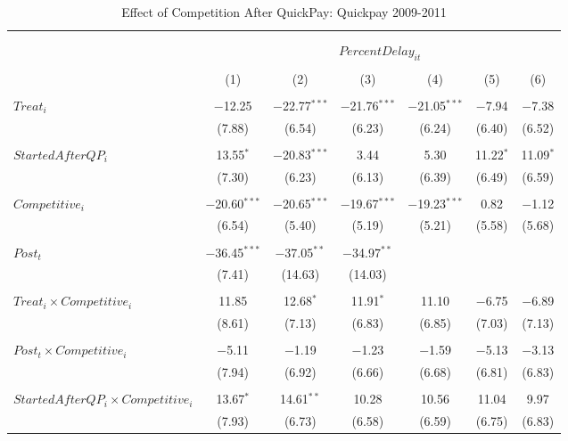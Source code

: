 \documentclass[
]{article}
\begin{document}
\begin{table}[H] \centering 
  \caption{Effect of Competition After QuickPay: Quickpay 2009-2011} 
  \label{} 
\small 
\begin{tabular}{@{\extracolsep{-3pt}}lcccccc} 
\\[-1.8ex]\hline 
\hline \\[-1.8ex] 
\\[-1.8ex] & \multicolumn{6}{c}{$PercentDelay_{it}$  } \\ 
\\[-1.8ex] & (1) & (2) & (3) & (4) & (5) & (6)\\ 
\hline \\[-1.8ex] 
 $Treat_i$ & $-$12.25 & $-$22.77$^{***}$ & $-$21.76$^{***}$ & $-$21.05$^{***}$ & $-$7.94 & $-$7.38 \\ 
  & (7.88) & (6.54) & (6.23) & (6.24) & (6.40) & (6.52) \\ 
  & & & & & & \\ 
 $StartedAfterQP_i$ & 13.55$^{*}$ & $-$20.83$^{***}$ & 3.44 & 5.30 & 11.22$^{*}$ & 11.09$^{*}$ \\ 
  & (7.30) & (6.23) & (6.13) & (6.39) & (6.49) & (6.59) \\ 
  & & & & & & \\ 
 $Competitive_i$ & $-$20.60$^{***}$ & $-$20.65$^{***}$ & $-$19.67$^{***}$ & $-$19.23$^{***}$ & 0.82 & $-$1.12 \\ 
  & (6.54) & (5.40) & (5.19) & (5.21) & (5.58) & (5.68) \\ 
  & & & & & & \\ 
 $Post_t$ & $-$36.45$^{***}$ & $-$37.05$^{**}$ & $-$34.97$^{**}$ &  &  &  \\ 
  & (7.41) & (14.63) & (14.03) &  &  &  \\ 
  & & & & & & \\ 
 $Treat_i \times Competitive_i$ & 11.85 & 12.68$^{*}$ & 11.91$^{*}$ & 11.10 & $-$6.75 & $-$6.89 \\ 
  & (8.61) & (7.13) & (6.83) & (6.85) & (7.03) & (7.13) \\ 
  & & & & & & \\ 
 $Post_t \times Competitive_i$ & $-$5.11 & $-$1.19 & $-$1.23 & $-$1.59 & $-$5.13 & $-$3.13 \\ 
  & (7.94) & (6.92) & (6.66) & (6.68) & (6.81) & (6.83) \\ 
  & & & & & & \\ 
 $StartedAfterQP_i \times Competitive_i$ & 13.67$^{*}$ & 14.61$^{**}$ & 10.28 & 10.56 & 11.04 & 9.97 \\ 
  & (7.93) & (6.73) & (6.58) & (6.59) & (6.75) & (6.83) \\ 

\end{tabular}
\end{table}
\end{document}
